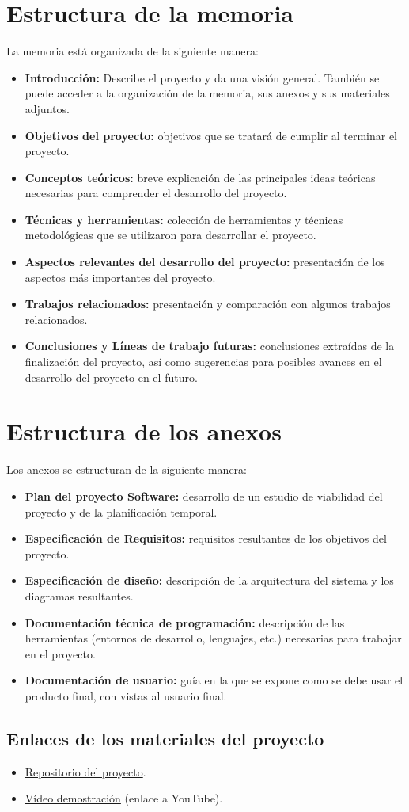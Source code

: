 \section{Estructura de la memoria}

La memoria está organizada de la siguiente manera:

\begin{itemize}
\item
  \textbf{Introducción:} Describe el proyecto y da una visión general. También se puede acceder a la organización de la memoria, sus anexos y sus materiales adjuntos.
\item
  \textbf{Objetivos del proyecto:} objetivos que se tratará de cumplir al terminar el proyecto. 
\item
  \textbf{Conceptos teóricos:} breve explicación de las principales ideas teóricas necesarias para comprender el desarrollo del proyecto.
\item
  \textbf{Técnicas y herramientas:} colección de herramientas y técnicas metodológicas que se utilizaron para desarrollar el proyecto.
\item
  \textbf{Aspectos relevantes del desarrollo del proyecto:} presentación de los aspectos más importantes del proyecto.
\item
  \textbf{Trabajos relacionados:} presentación y comparación con algunos trabajos relacionados.
\item
  \textbf{Conclusiones y Líneas de trabajo futuras:} conclusiones extraídas de la finalización del proyecto, así como sugerencias para posibles avances en el desarrollo del proyecto en el futuro.
\end{itemize}

\section{Estructura de los anexos}

Los anexos se estructuran de la siguiente manera:

\begin{itemize}
\item
  \textbf{Plan del proyecto Software:} desarrollo de un estudio de viabilidad del proyecto y de la planificación temporal.
\item
  \textbf{Especificación de Requisitos:} requisitos resultantes de los objetivos del proyecto.
\item
  \textbf{Especificación de diseño:} descripción de la arquitectura del sistema y los diagramas resultantes.
\item
  \textbf{Documentación técnica de programación:} descripción de las herramientas (entornos de desarrollo, lenguajes, etc.) necesarias para trabajar en el proyecto.
\item
  \textbf{Documentación de usuario:} guía en la que se expone como se debe usar el producto final, con vistas al usuario final.
\end{itemize}

\subsection{Enlaces de los materiales del proyecto}

\begin{itemize}
\item
	\href{https://github.com/fmv1001/F1RacePredictor}{Repositorio del proyecto}.
\item
	\href{}{Vídeo demostración} (enlace a YouTube).
\end{itemize}